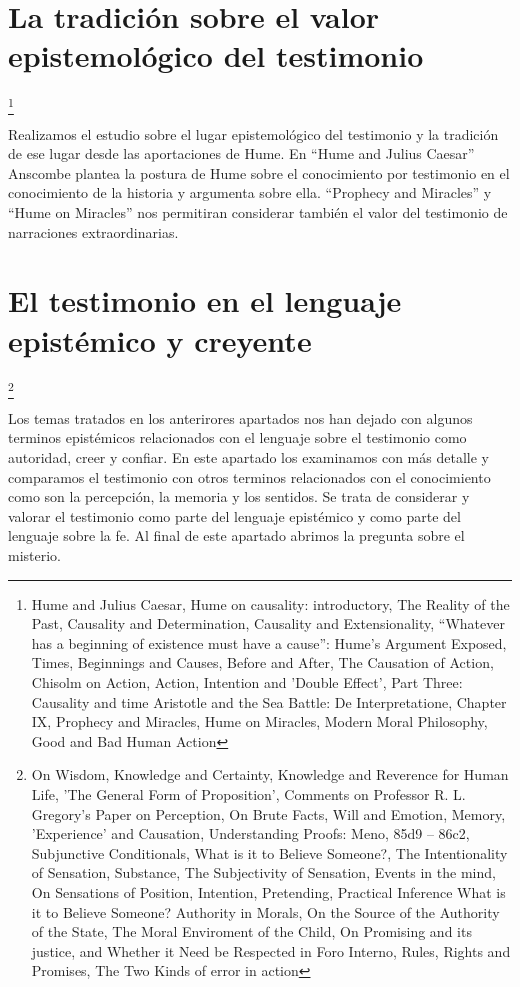 \documentclass[../main.tex]{subfiles}
\begin{document}
\section{La tradición sobre el valor epistemológico del testimonio}
\footnote{
Hume and Julius Caesar, 
Hume on causality: introductory, 
The Reality of the Past, 
Causality and Determination, 
Causality and Extensionality, 
“Whatever has a beginning of existence must have a cause”: Hume's Argument Exposed, 
Times, Beginnings and Causes, 
Before and After, 
The Causation of Action, 
Chisolm on Action, 
Action, Intention and 'Double Effect', 
Part Three: Causality and time
Aristotle and the Sea Battle: De Interpretatione, Chapter IX, 
Prophecy and Miracles, 
Hume on Miracles, 
Modern Moral Philosophy, 
Good and Bad Human Action
}

Realizamos el estudio sobre el lugar epistemológico del testimonio y la tradición de ese lugar desde las aportaciones de Hume. En ``Hume and Julius Caesar'' Anscombe plantea la postura de Hume sobre el conocimiento por testimonio en el conocimiento de la historia y argumenta sobre ella. ``Prophecy and Miracles'' y ``Hume on Miracles'' nos permitiran considerar también el valor del testimonio de narraciones extraordinarias. 

\section{El testimonio en el lenguaje epistémico y creyente}
\footnote{
On Wisdom, 
Knowledge and Certainty, 
Knowledge and Reverence for Human Life, 
'The General Form of Proposition', 
Comments on Professor R. L. Gregory's Paper on Perception, 
On Brute Facts, 
Will and Emotion, 
Memory, 'Experience' and Causation, 
Understanding Proofs: Meno, 85d9 – 86c2, 
Subjunctive Conditionals, 
What is it to Believe Someone?, 
The Intentionality of Sensation, 
Substance, 
The Subjectivity of Sensation, 
Events in the mind, 
On Sensations of Position, 
Intention, 
Pretending, 
Practical Inference
What is it to Believe Someone?
Authority in Morals, 
On the Source of the Authority of the State, 
The Moral Enviroment of the Child, 
On Promising and its justice, and Whether it Need be Respected in Foro Interno, 
Rules, Rights and Promises, 
The Two Kinds of error in action
}

Los temas tratados en los anterirores apartados nos han dejado con algunos terminos epistémicos relacionados con el lenguaje sobre el testimonio como autoridad, creer y confiar. En este apartado los examinamos con más detalle y comparamos el testimonio con otros terminos relacionados con el conocimiento como son la percepción, la memoria y los sentidos. Se trata de considerar y valorar el testimonio como parte del lenguaje epistémico y como parte del lenguaje sobre la fe. Al final de este apartado abrimos la pregunta sobre el misterio.
\end{document}
